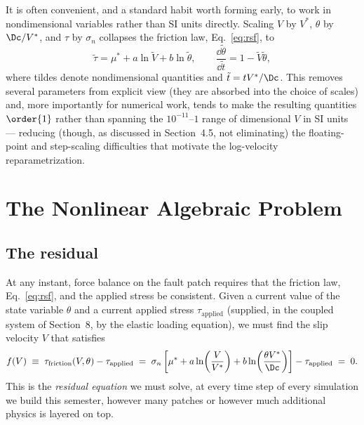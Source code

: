 It is often convenient, and a standard habit worth forming early, to work in nondimensional variables rather than SI units directly. Scaling $V$ by $V^\ast$, $\theta$ by $\Dc/V^\ast$, and $\tau$ by $\sigma_n$ collapses the friction law, Eq.~\eqref{eq:rsf}, to
\begin{equation}
\tilde\tau = \mu^\ast + a\ln\tilde V + b\ln\tilde\theta, \qquad \frac{\dd\tilde\theta}{\dd \tilde t} = 1 - \tilde V\tilde\theta,
\end{equation}
where tildes denote nondimensional quantities and $\tilde t = t V^\ast/\Dc$. This removes several parameters from explicit view (they are absorbed into the choice of scales) and, more importantly for numerical work, tends to make the resulting quantities $\order{1}$ rather than spanning the $10^{-11}$--$1$ range of dimensional $V$ in SI units --- reducing (though, as discussed in Section~4.5, not eliminating) the floating-point and step-scaling difficulties that motivate the log-velocity reparametrization.

\section{The Nonlinear Algebraic Problem}

\subsection{The residual}

At any instant, force balance on the fault patch requires that the friction law, Eq.~\eqref{eq:rsf}, and the applied stress be consistent. Given a current value of the state variable $\theta$ and a current applied stress $\tau_{\mathrm{applied}}$ (supplied, in the coupled system of Section~8, by the elastic loading equation), we must find the slip velocity $V$ that satisfies
\begin{equation}
f(V) \;\equiv\; \tau_{\mathrm{friction}}(V, \theta) - \tau_{\mathrm{applied}} \;=\; \sigma_n\left[\mu^\ast + a \ln\!\left(\frac{V}{V^\ast}\right) + b \ln\!\left(\frac{\theta V^\ast}{\Dc}\right)\right] - \tau_{\mathrm{applied}} \;=\; 0.
\label{eq:residual}
\end{equation}
This is the \emph{residual equation} we must solve, at every time step of every simulation we build this semester, however many patches or however much additional physics is layered on top.

